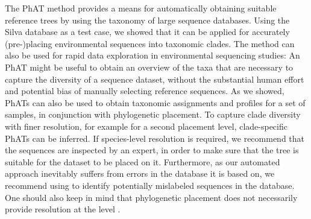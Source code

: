 The \acf{PhAT} method provides a means for automatically obtaining suitable reference trees
by using the taxonomy of large sequence databases.
Using the Silva database as a test case,
we showed that it can be applied for accurately (pre-)placing environmental sequences into taxonomic clades.
The method can also be used for rapid data exploration in environmental sequencing studies:
An \ac{PhAT} might be useful to obtain an overview of the taxa that are necessary to capture the diversity of a sequence dataset,
without the substantial human effort and potential bias of manually selecting reference sequences.
As we showed, \acp{PhAT} can also be used to obtain taxonomic assignments and profiles for a set of samples,
in conjunction with phylogenetic placement.
To capture clade diversity with finer resolution, for example for a second placement level,
clade-specific \acp{PhAT} can be inferred.
If species-level resolution is required, we recommend that the sequences are inspected by an expert,
in order to make sure that the tree is suitable for the dataset to be placed on it.
Furthermore, as our automated approach inevitably suffers from errors in the database it is based on,
we recommend using  \citep{Kozlov2016}
to identify potentially mislabeled sequences in the database.
One should also keep in mind that phylogenetic placement
does not necessarily provide resolution at the  level \citep{Dunthorn2014}.

